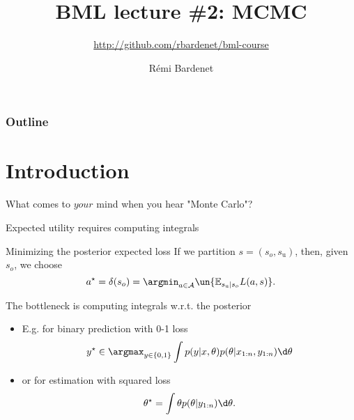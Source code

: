 \documentclass[10pt]{beamer}
\title[Bayesian ML: Bayesics]{BML lecture \#2: MCMC}
\subtitle{\url{http://github.com/rbardenet/bml-course}}
\author[Rémi Bardenet (CNRS \& Univ. Lille)] %
{Rémi Bardenet}
\institute[] %
{
  CNRS \& CRIStAL, Univ. Lille, France\\
\vspace{1cm}
\texttt{[image: /Users/rbardenet/Work/Tex/PosterImages/logoCNRS.pdf]}
\qquad \texttt{[image: /Users/rbardenet/Work/Tex/PosterImages/cristalLogo.pdf]}
}
\date{}
\begin{document}
\begin{frame}
\maketitle
\end{frame}

\begin{frame}
\frametitle{Outline}
\tableofcontents
\end{frame}

\section{Introduction}

\begin{frame}{What comes to $your$ mind when you hear "Monte Carlo"?}
\end{frame}

\begin{frame}{Expected utility requires computing integrals}
  \begin{block}{Minimizing the posterior expected loss}
  If we partition $s=(s_{o}, s_{\text{u}})$, then, given $s_o$, we choose
  $$
  a^\star = \delta(s_o) = \argmin_{a\in\mathcal{A}} \un{\mathbb{E}_{s_{\text{u}}\vert s_{o}} L(a,s)}.
  $$
\end{block}

  \begin{alertblock}{The bottleneck is computing integrals w.r.t. the posterior}
  \begin{itemize}
    \item E.g. for binary prediction with 0-1 loss
    $$
    y^\star \in \argmax_{y\in\{0,1\}} \int p(y\vert x,\theta) p(\theta\vert x_{1:n}, y_{1:n}) \d\theta
    $$
    \item or for estimation with squared loss
    $$
    \theta^\star = \int \theta p(\theta\vert y_{1:n}) \d\theta.
    $$
  \end{itemize}
\end{alertblock}
\end{frame}
\end{document}
